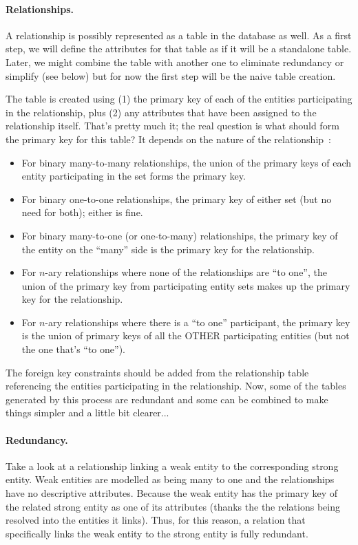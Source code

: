 \paragraph{Relationships.} 
A relationship is possibly represented as a table in the database as well. As a first step, we will define the attributes for that table as if it will be a standalone table. Later, we might combine the table with another one to eliminate redundancy or simplify (see below) but for now the first step will be the naive table creation.

The table is created using (1) the primary key of each of the entities participating in the relationship, plus (2) any attributes that have been assigned to the relationship itself. That's pretty much it; the real question is what should form the primary key for this table? It depends on the nature of the relationship~\cite{dsc}:

\begin{itemize}
	\item For binary many-to-many relationships, the union of the primary keys of each entity participating in the set forms the primary key.
	\item For binary one-to-one relationships, the primary key of either set (but no need for both); either is fine.
	\item For binary many-to-one (or one-to-many) relationships, the primary key of the entity on the ``many'' side is the primary key for the relationship.
	\item For $n$-ary relationships where none of the relationships are ``to one'', the union of the primary key from participating entity sets makes up the primary key for the relationship.
	\item For $n$-ary relationships where there is a ``to one'' participant, the primary key is the union of primary keys of all the OTHER participating entities (but not the one that's ``to one''). 
\end{itemize}

The foreign key constraints should be added from the relationship table referencing the entities participating in the relationship. Now, some of the tables generated by this process are redundant and some can be combined to make things simpler and a little bit clearer...

\paragraph{Redundancy.}
Take a look at a relationship linking a weak entity to the corresponding strong entity. Weak entities are modelled as being many to one and the relationships have no descriptive attributes. Because the weak entity has the primary key of the related strong entity as one of its attributes (thanks the the relations being resolved into the entities it links). Thus, for this reason, a relation that specifically links the weak entity to the strong entity is fully redundant. 

